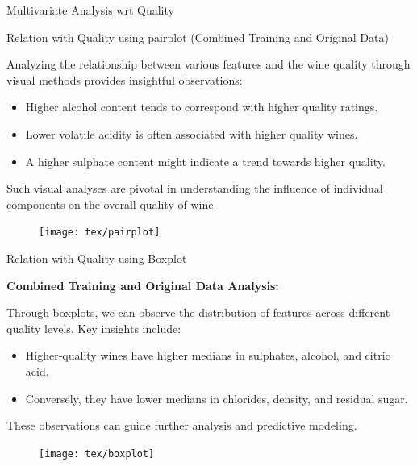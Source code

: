 \documentclass[
 size=14pt,
 paper=smartboard,  %
 mode=present, 		%
 display=slides, 	%
 style=tuliplab,  	%
 pauseslide,
 fleqn,leqno]{powerdot}
\begin{document}
\begin{slide}[toc=]{Multivariate Analysis wrt Quality}
	\begin{minipage}[t]{0.48\textwidth}
		Relation with Quality using pairplot (Combined Training and Original Data)
		
		\smallskip
		
		Analyzing the relationship between various features and the wine quality through visual methods provides insightful observations:
		
		\begin{itemize}
			\item Higher alcohol content tends to correspond with higher quality ratings.
			\item Lower volatile acidity is often associated with higher quality wines.
			\item A higher sulphate content might indicate a trend towards higher quality.
		\end{itemize}
		
		Such visual analyses are pivotal in understanding the influence of individual components on the overall quality of wine.
	\end{minipage}
	\hfill
	\begin{minipage}[t]{0.48\textwidth}
		\centering
		\begin{figure}
			\centering
			\texttt{[image: tex/pairplot]}
		\end{figure}
	\end{minipage}
\end{slide}
\begin{slide}[toc=]{Relation with Quality using Boxplot}
	\begin{minipage}{0.5\textwidth}
		
			\textbf{Combined Training and Original Data Analysis:}
			
			Through boxplots, we can observe the distribution of features across different quality levels. Key insights include:
			
			\begin{itemize}
				\item Higher-quality wines have higher medians in sulphates, alcohol, and citric acid.
				\item Conversely, they have lower medians in chlorides, density, and residual sugar.
			\end{itemize}
			
			These observations can guide further analysis and predictive modeling.
	\end{minipage}%
	\hfill
	\begin{minipage}{0.45\textwidth}
		\centering
		\begin{figure}
			\centering
			\texttt{[image: tex/boxplot]}
		\end{figure}
		
	\end{minipage}
\end{slide}
\end{document}
